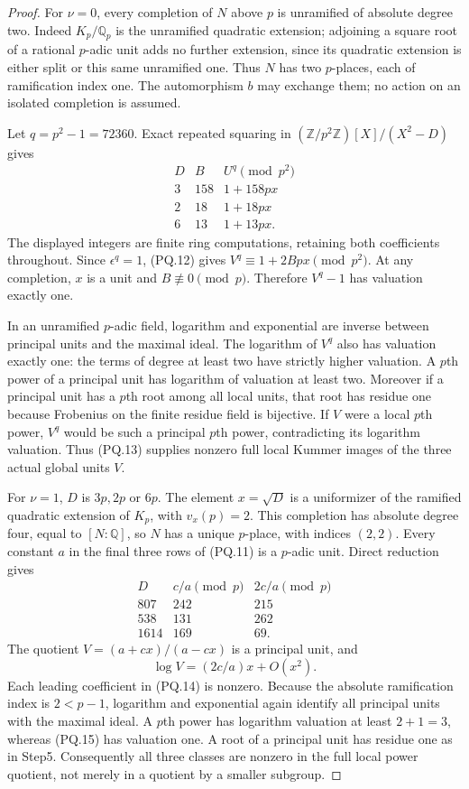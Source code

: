 \begin{proof}
For $\nu=0$, every completion of $N$ above $p$ is unramified
of absolute degree two.  Indeed $K_p/\mathbb Q_p$ is the
unramified quadratic extension; adjoining a square root of a
rational $p$-adic unit adds no further extension, since its
quadratic extension is either split or this same unramified one.
Thus $N$ has two $p$-places, each of ramification index one.
The automorphism $b$ may exchange them; no action on an isolated
completion is assumed.

Let $q=p^2-1=72360$.
Exact repeated squaring in
$(\mathbb Z/p^2\mathbb Z)[X]/(X^2-D)$ gives
\[
 \begin{array}{c|r|c}
 D&B&U^q\pmod{p^2}\\ \hline
 3&158&1+158p x\\
 2&18&1+18p x\\
 6&13&1+13p x.
 \end{array}
 \tag{PQ.13}
\]
The displayed integers are finite ring computations, retaining
both coefficients throughout.
Since $\epsilon^q=1$, (PQ.12) gives
$V^q\equiv1+2Bp x\pmod{p^2}$.
At any completion, $x$ is a unit and $B\not\equiv0\pmod p$.
Therefore $V^q-1$ has valuation exactly one.

In an unramified $p$-adic field, logarithm and exponential are
inverse between principal units and the maximal ideal.
The logarithm of $V^q$ also has valuation exactly one: the
terms of degree at least two have strictly higher valuation.
A $p$th power of a principal unit has logarithm of valuation
at least two.  Moreover if a principal unit has a $p$th root
among all local units, that root has residue one because
Frobenius on the finite residue field is bijective.
If $V$ were a local $p$th power, $V^q$ would be such a principal
$p$th power, contradicting its logarithm valuation.
Thus (PQ.13) supplies nonzero full local Kummer images of the
three actual global units $V$.

For $\nu=1$, $D$ is $3p,2p$ or $6p$.
The element $x=\sqrt D$ is a uniformizer of the ramified quadratic
extension of $K_p$, with $v_x(p)=2$.
This completion has absolute degree four, equal to $[N:\mathbb Q]$,
so $N$ has a unique $p$-place, with indices $(2,2)$.
Every constant $a$ in the final three rows of (PQ.11) is a
$p$-adic unit.  Direct reduction gives
\[
 \begin{array}{c|r|r}
 D&c/a\pmod p&2c/a\pmod p\\ \hline
 807&242&215\\
 538&131&262\\
 1614&169&69.
 \end{array}
 \tag{PQ.14}
\]
The quotient $V=(a+cx)/(a-cx)$ is a principal unit, and
\[
                     \log V=(2c/a)x+O(x^2).
 \tag{PQ.15}
\]
Each leading coefficient in (PQ.14) is nonzero.
Because the absolute ramification index is $2<p-1$, logarithm
and exponential again identify all principal units with the
maximal ideal.  A $p$th power has logarithm valuation at least
$2+1=3$, whereas (PQ.15) has valuation one.
A root of a principal unit has residue one as in Step5.
Consequently all three classes are nonzero in the full local
power quotient, not merely in a quotient by a smaller subgroup.


\end{proof}
